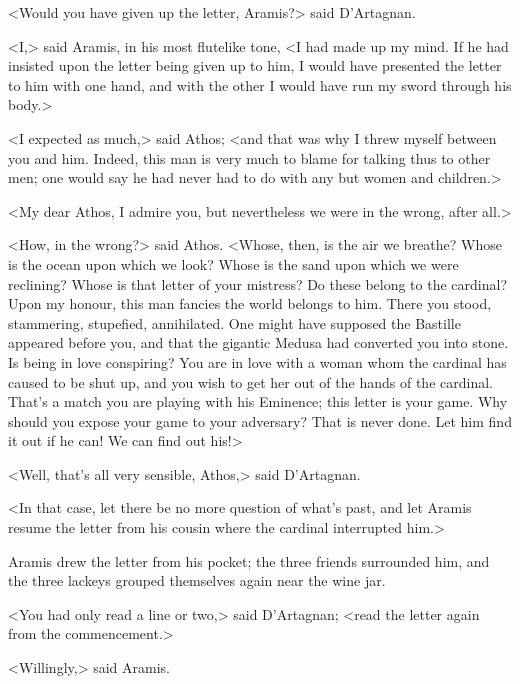 <Would you have given up the letter, Aramis?> said D'Artagnan. 

<I,> said Aramis, in his most flutelike tone, <I had made up my mind. If he had insisted upon the letter being given up to him, I would have presented the letter to him with one hand, and with the other I would have run my sword through his body.> 

<I expected as much,> said Athos; <and that was why I threw myself between you and him. Indeed, this man is very much to blame for talking thus to other men; one would say he had never had to do with any but women and children.> 

<My dear Athos, I admire you, but nevertheless we were in the wrong, after all.> 

<How, in the wrong?> said Athos. <Whose, then, is the air we breathe? Whose is the ocean upon which we look? Whose is the sand upon which we were reclining? Whose is that letter of your mistress? Do these belong to the cardinal? Upon my honour, this man fancies the world belongs to him. There you stood, stammering, stupefied, annihilated. One might have supposed the Bastille appeared before you, and that the gigantic Medusa had converted you into stone. Is being in love conspiring? You are in love with a woman whom the cardinal has caused to be shut up, and you wish to get her out of the hands of the cardinal. That's a match you are playing with his Eminence; this letter is your game. Why should you expose your game to your adversary? That is never done. Let him find it out if he can! We can find out his!> 

<Well, that's all very sensible, Athos,> said D'Artagnan. 

<In that case, let there be no more question of what's past, and let Aramis resume the letter from his cousin where the cardinal interrupted him.> 

Aramis drew the letter from his pocket; the three friends surrounded him, and the three lackeys grouped themselves again near the wine jar. 

<You had only read a line or two,> said D'Artagnan; <read the letter again from the commencement.> 

<Willingly,> said Aramis. 

